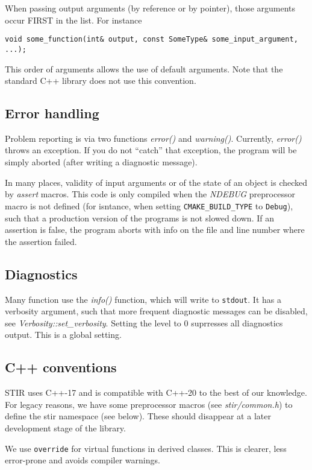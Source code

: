 \documentclass{article}
\begin{document}
When passing output arguments (by reference or by pointer), those 
arguments occur FIRST in the list. For instance
\begin{verbatim}
void some_function(int& output, const SomeType& some_input_argument, ...);
\end{verbatim}


This order of arguments allows the use of default arguments. 
Note that the standard C++ library does not use this convention.

\subsection{
Error handling }

Problem reporting is via two functions \textit{error()} and \textit{warning()}. 
Currently, \textit{error()} throws an exception. If you do not ``catch'' that
exception, the program will be simply aborted (after writing 
a diagnostic message). 

In many places, validity of input arguments or of the state of 
an object is checked by \textit{assert} macros. This code is only 
compiled when the \textit{NDEBUG} preprocessor macro is not defined (for isntance,
when setting \texttt{CMAKE\_BUILD\_TYPE} to \texttt{Debug}), 
such that a production version of the programs 
is not slowed down. If an assertion is false, the program aborts 
with info on the file and line number where the assertion failed.

\subsection{Diagnostics}
Many function use the \textit{info()} function, which will write to
\texttt{stdout}. It has a verbosity argument, such that more frequent
diagnostic messages can be disabled, see \textit{Verbosity::set\_verbosity}.
Setting the level to 0 suprresses all diagnostics output. This is a global setting.

\subsection{C++ conventions}
STIR uses C++-17 and is compatible with C++-20 to the best of our knowledge.
For legacy reasons, we have some preprocessor 
macros (see \textit{stir/common.h}) to define the stir namespace (see below).
These should disappear at a 
later development stage of the library.

We use \texttt{override} for virtual functions in derived classes. This is clearer,
less error-prone and avoids compiler warnings.
\end{document}
